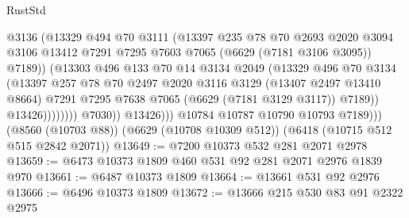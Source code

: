 \begin{lexlean}{RustStd}
\begin{coremodule}
                                  @3136
                                  (@13329
                                    @494
                                    @70
                                    @3111
                                    (@13397
                                      @235
                                      @78
                                      @70
                                      @2693
                                      @2020
                                      @3094
                                      @3106
                                      @13412
                                      @7291
                                      @7295
                                      @7603
                                      @7065
                                      (@6629 (@7181 @3106 @3095))
                                      @7189))
                                  (@13303
                                    @496
                                    @133
                                    @70
                                    @14
                                    @3134
                                    @2049
                                    (@13329
                                      @496
                                      @70
                                      @3134
                                      (@13397
                                        @257
                                        @78
                                        @70
                                        @2497
                                        @2020
                                        @3116
                                        @3129
                                        (@13407 @2497 @13410 @8664)
                                        @7291
                                        @7295
                                        @7638
                                        @7065
                                        (@6629 (@7181 @3129 @3117))
                                        @7189))
                                    @13426))))))))
                    @7030))
                @13426)))
          @10784
          @10787
          @10790
          @10793
          @7189)))
    (@8560 (@10703 @88))
    (@6629 (@10708 @10309 @512))
    (@6418 (@10715 @512 @515 @2842 @2071))
@13649 := @7200 @10373 @532 @281 @2071 @2978
@13659 := @6473 @10373 @1809 @460 @531 @92 @281 @2071 @2976 @1839 @970
@13661 := @6487 @10373 @1809
@13664 := @13661 @531 @92 @2976
@13666 := @6496 @10373 @1809
@13672 := @13666 @215 @530 @83 @91 @2322 @2975

\end{coremodule}
\end{lexlean}
